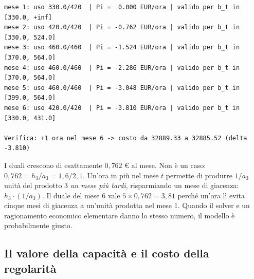 \begin{lstlisting}[style=output]
mese 1: uso 330.0/420  | Pi =  0.000 EUR/ora | valido per b_t in [330.0, +inf]
mese 2: uso 420.0/420  | Pi = -0.762 EUR/ora | valido per b_t in [330.0, 524.0]
mese 3: uso 460.0/460  | Pi = -1.524 EUR/ora | valido per b_t in [370.0, 564.0]
mese 4: uso 460.0/460  | Pi = -2.286 EUR/ora | valido per b_t in [370.0, 564.0]
mese 5: uso 460.0/460  | Pi = -3.048 EUR/ora | valido per b_t in [399.0, 564.0]
mese 6: uso 420.0/420  | Pi = -3.810 EUR/ora | valido per b_t in [330.0, 431.0]

Verifica: +1 ora nel mese 6 -> costo da 32889.33 a 32885.52 (delta -3.810)
\end{lstlisting}

\begin{spiegazione}
I duali crescono di esattamente $0{,}762$ \euro{} al mese. Non è un caso:
$0{,}762 = h_3 / a_3 = 1{,}6 / 2{,}1$. Un'ora in più nel mese $t$ permette di produrre
$1/a_3$ unità del prodotto 3 \emph{un mese più tardi}, risparmiando un mese di giacenza:
$h_3 \cdot (1/a_3)$. Il duale del mese 6 vale $5 \times 0{,}762 = 3{,}81$ perché
un'ora lì evita cinque mesi di giacenza a un'unità prodotta nel mese 1. Quando il
solver e un ragionamento economico elementare danno lo stesso numero, il modello è
probabilmente giusto.
\end{spiegazione}

\subsection*{Il valore della capacità e il costo della regolarità}

